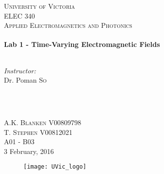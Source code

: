 \begin{titlepage}

\center
 
\textsc{\LARGE University of Victoria}\\[1cm] 	%
\textsc{\Large ELEC 340}\\[0.5cm] 			%
\textsc{\large Applied Electromagnetics and Photonics}\\[0.5cm] 		%


\HRule \\[0.4cm]
{\huge \bfseries Lab 1 - Time-Varying Electromagnetic Fields}\\[0.2cm] %
\HRule \\[1.5cm]
 
 
\begin{minipage}{0.7\textwidth}
\begin{flushleft} 

\large\emph{Instructor:} \\
Dr. Poman \textsc{So} \\
\vspace{12 pt}

\end{flushleft}
\end{minipage}
~
\begin{minipage}{0.1\textwidth}
\begin{flushright} \large

\vspace{12 pt}

\end{flushright}
\end{minipage}\\[2cm]


\Large A.K. \textsc{Blanken}
\large V00809798 \\
\Large T. \textsc{Stephen}
\large V00812021	\\
A01 - B03\\[1.5cm] 


{\large 3 February, 2016}\\ %

\begin{figure}[b]
	\centering
	\texttt{[image: UVic\_logo]}
\end{figure}

\end{titlepage}
